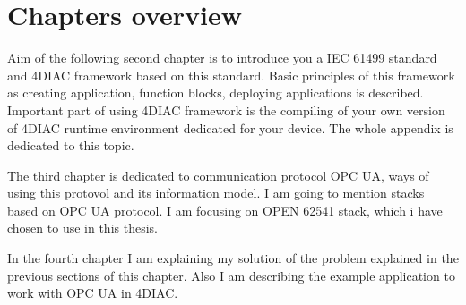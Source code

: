 
\section{Chapters overview}
Aim of the following second chapter is to introduce you a IEC 61499 standard and 4DIAC framework based on this standard.
Basic principles of this framework as creating application, function blocks, deploying applications is described.
Important part of using 4DIAC framework is the compiling of your own version of 4DIAC runtime environment dedicated for your device. The whole appendix is dedicated to this topic.

The third chapter is dedicated to communication protocol OPC UA, ways of using this protovol and its information model. I am going to mention stacks based on OPC UA protocol. I am focusing on OPEN 62541 stack, which i have chosen to use in this thesis. 

In the fourth chapter I am explaining my solution of the problem explained in the previous sections of this chapter. Also I am describing the example application to work with OPC UA in 4DIAC.





